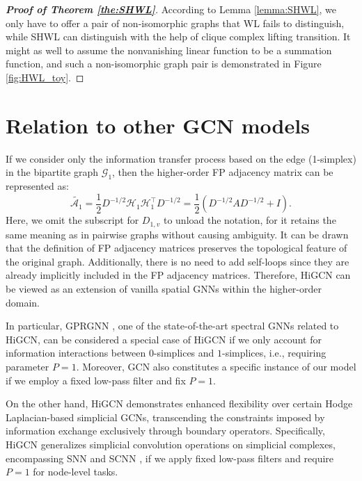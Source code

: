 \documentclass[letterpaper]{article} \usepackage{aaai24}
\theoremstyle{plain}
\theoremstyle{definition}
\theoremstyle{remark}
\begin{document}
\begin{proof} [\textbf{Proof of Theorem \ref{the:SHWL}}]
According to Lemma \ref{lemma:SHWL}, we only have to offer a pair of non-isomorphic graphs that WL fails to distinguish, while SHWL can distinguish with the help of clique complex lifting transition. It might as well to assume the nonvanishing linear function to be a summation function, and such a non-isomorphic graph pair is demonstrated in Figure \ref{fig:HWL_toy}.
\end{proof}



\section{Relation to other GCN models}
\label{appendix:relation_to_GCNs}

If we consider only the information transfer process based on the edge (1-simplex) in the bipartite graph $\mathcal{G}_1$, then the higher-order FP adjacency matrix can be represented as:
\begin{equation}
    \tilde{\mathcal{A}_1} = \frac{1}{2}D^{-1/2}\mathcal{H}_1 \mathcal{H}_1^\top D^{-1/2}=\frac{1}{2}\left(D^{-1/2}AD^{-1/2}+I\right).
    \label{equ:A1}
\end{equation}
Here, we omit the subscript for $D_{1,v}$ to unload the notation, for it retains the same meaning as in pairwise graphs without causing ambiguity.
It can be drawn that the definition of FP adjacency matrices preserves the topological feature of the original graph. 
Additionally, there is no need to add self-loops since they are already implicitly included in the FP adjacency matrices.
Therefore, HiGCN can be viewed as an extension of vanilla spatial GNNs within the higher-order domain.





In particular, GPRGNN \cite{GPRGNN}, one of the state-of-the-art spectral GNNs related to HiGCN, can be considered a special case of HiGCN if we only account for information interactions between $0$-simplices and $1$-simplices, i.e., requiring parameter $P=1$. Moreover, GCN \cite{GCN} also constitutes a specific instance of our model if we employ a fixed low-pass filter and fix $P=1$.

On the other hand, HiGCN demonstrates enhanced flexibility over certain Hodge Laplacian-based simplicial GCNs, transcending the constraints imposed by information exchange exclusively through boundary operators.
Specifically, HiGCN generalizes simplicial convolution operations on simplicial complexes, encompassing SNN \cite{SNN2020} and SCNN \cite{SCNN2022}, if we apply fixed low-pass filters and require $P=1$ for node-level tasks.
\end{document}
